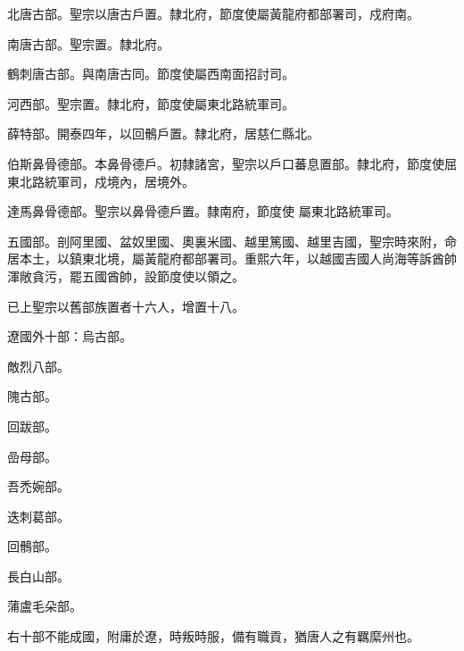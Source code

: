 \begin{pinyinscope}
 北唐古部。聖宗以唐古戶置。隸北府，節度使屬黃龍府都部署司，戍府南。



 南唐古部。聖宗置。隸北府。



 鶴刺唐古部。與南唐古同。節度使屬西南面招討司。



 河西部。聖宗置。隸北府，節度使屬東北路統軍司。



 薛特部。開泰四年，以回鶻戶置。隸北府，居慈仁縣北。



 伯斯鼻骨德部。本鼻骨德戶。初隸諸宮，聖宗以戶口蕃息置部。隸北府，節度使屈東北路統軍司，戍境內，居境外。



 達馬鼻骨德部。聖宗以鼻骨德戶置。隸南府，節度使
 屬東北路統軍司。



 五國部。剖阿里國、盆奴里國、奧裏米國、越里篤國、越里吉國，聖宗時來附，命居本土，以鎮東北境，屬黃龍府都部署司。重熙六年，以越國吉國人尚海等訴酋帥渾敞貪污，罷五國酋帥，設節度使以領之。



 已上聖宗以舊部族置者十六人，增置十八。



 遼國外十部：烏古部。



 敵烈八部。



 隗古部。



 回跋部。



 嵒母部。



 吾禿婉部。



 迭刺葛部。



 回鶻部。



 長白山部。



 蒲盧毛朵部。



 右十部不能成國，附庸於遼，時叛時服，備有職貢，猶唐人之有羈縻州也。



\end{pinyinscope}
